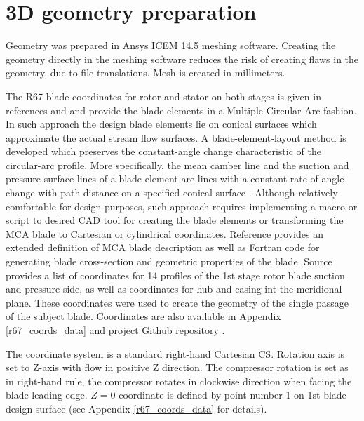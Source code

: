 \section{3D geometry preparation} \label{3dgeom}
Geometry was prepared in Ansys ICEM 14.5 meshing software. Creating the geometry directly in the meshing software reduces the risk of creating flaws in the geometry, due to file translations. Mesh is created in millimeters.

The R67 blade coordinates for rotor and stator on both stages is given in references \citep{r67design} and \citep{r67performance} and provide the blade elements in a Multiple-Circular-Arc fashion. In such approach the design blade elements lie on conical surfaces which approximate the actual stream flow surfaces. A blade-element-layout method is developed which preserves the constant-angle change characteristic of the circular-arc profile. More specifically, the mean camber line and the suction and pressure surface lines of a blade element are lines with a constant rate of angle change with path distance on a specified conical surface \citep{bladecompose}. Although relatively comfortable for design purposes, such approach requires implementing a macro or script to desired CAD tool for creating the blade elements or transforming the MCA blade to Cartesian or cylindrical coordinates. Reference \citep{bladecompose} provides an extended definition of MCA blade description as well as Fortran code for generating blade cross-section and geometric properties of the blade. Source \citep{r67laser} provides a list of coordinates for 14 profiles of the 1st stage rotor blade suction and pressure side, as well as coordinates for hub and casing int the meridional plane. These coordinates were used to create the geometry of the single passage of the subject blade. Coordinates are also available in Appendix \ref{r67_coords_data} and project Github repository \citep{github}.

The coordinate system is a standard right-hand Cartesian CS. Rotation axis is set to Z-axis with flow in positive Z direction. The compressor rotation is set as in right-hand rule, the compressor rotates in clockwise direction when facing the blade leading edge. $Z = 0$ coordinate is defined by point number 1 on 1st blade design surface (see Appendix \ref{r67_coords_data} for details). 


